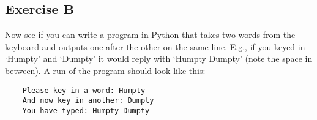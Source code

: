 \subsection*{Exercise B}

Now see if you can write a program in Python that takes
two words from the keyboard and outputs one after the other on the same line. 
E.g., if you keyed in `Humpty' and `Dumpty' 
it would reply with `Humpty Dumpty' (note the space in between).
A run of the program should look like this:

\begin{Verbatim}
    Please key in a word: Humpty
    And now key in another: Dumpty
    You have typed: Humpty Dumpty
\end{Verbatim}


 	


